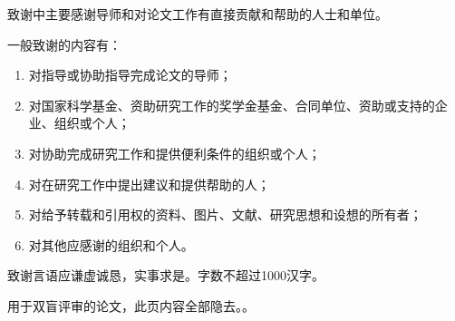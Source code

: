 

致谢中主要感谢导师和对论文工作有直接贡献和帮助的人士和单位。

一般致谢的内容有：
\begin{enumerate}
	\item 对指导或协助指导完成论文的导师；
	\item 对国家科学基金、资助研究工作的奖学金基金、合同单位、资助或支持的企业、组织或个人；
	\item 对协助完成研究工作和提供便利条件的组织或个人；
	\item 对在研究工作中提出建议和提供帮助的人；
	\item 对给予转载和引用权的资料、图片、文献、研究思想和设想的所有者；
	\item 对其他应感谢的组织和个人。
\end{enumerate}

致谢言语应谦虚诚恳，实事求是。字数不超过1000汉字。

\vspace{2em}
{\color{red} 用于双盲评审的论文，此页内容全部隐去。}。
